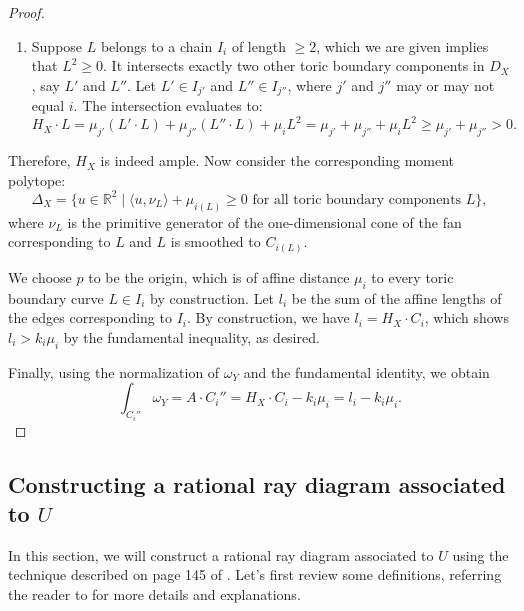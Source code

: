 \documentclass[11pt, reqno]{amsart}
\theoremstyle{definition}
\begin{document}
\begin{proof}
\begin{enumerate}
\item Suppose $L$ belongs to a chain $I_i$ of length $\ge 2$, which we are given implies that $L^2 \ge 0$. It intersects exactly two other toric boundary components in $D_X$, say $L'$ and $L''$. Let $L' \in I_{j'}$ and $L'' \in I_{j''}$, where $j'$ and $j''$ may or may not equal $i$. The intersection evaluates to:
\[
H_X \cdot L = \mu_{j'} (L' \cdot L) + \mu_{j''} (L'' \cdot L) + \mu_i L^2 = \mu_{j'} + \mu_{j''} + \mu_i L^2\ge \mu_{j'} + \mu_{j''} > 0.
\] 



\end{enumerate}



Therefore, $H_X$ is indeed ample. Now consider the corresponding moment polytope:
\[ \Delta_X = \{ u \in \mathbb{R}^2 \mid \langle u, \nu_L \rangle + \mu_{i(L)} \ge 0 \text{ for all toric boundary components $L$} \}, \] where $\nu_L$ is the primitive generator of the one-dimensional cone of the fan corresponding to $L$ and $L$ is smoothed to $C_{i(L)}.$



We choose $p$ to be the origin, which is of affine distance $\mu_i$ to every toric boundary curve $L \in I_i$ by construction. Let $l_i$ be the sum of the affine lengths of the edges corresponding to $I_i$. By construction, we have $l_i = H_X \cdot C_i$, which shows $l_i > k_i \mu_i$ by the fundamental inequality, as desired.

Finally, using the normalization of $\omega_Y$ and the fundamental identity, we obtain
\[
\int_{C_i''}\omega_Y
=A\cdot C_i''
=H_X\cdot C_i-k_i\mu_i
=l_i-k_i\mu_i.
\]


\end{proof}





\subsection{Constructing a rational ray diagram associated to $U$}

In this section, we will construct a rational ray diagram associated to $U$ using the technique described on page 145 of \cite{Eva23}. Let's first review some definitions, referring the reader to \cite{Eva23} for more details and explanations.
\end{document}
